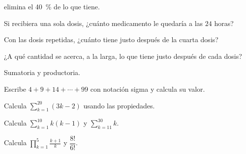 \documentclass[11pt,a4paper]{article}
\begin{document}
\begin{ejercicios}
  elimina el \SI{40}{\percent} de lo que tiene.
  \begin{ejercicios}
  \item Si recibiera una sola dosis, ¿cuánto medicamento le quedaría a las $24$ horas?
  \item Con las dosis repetidas, ¿cuánto tiene justo después de la cuarta dosis?
  \item ¿A qué cantidad se acerca, a la larga, lo que tiene justo después de cada dosis?
  \end{ejercicios}
\item Sumatoria y productoria.
  \begin{ejercicios}
  \item Escribe $4+9+14+\cdots+99$ con notación sigma y calcula su valor.
  \item Calcula $\displaystyle\sum_{k=1}^{20}(3k-2)$ usando las propiedades.
  \item Calcula $\displaystyle\sum_{k=1}^{10}k(k-1)$ y $\displaystyle\sum_{k=11}^{30}k$.
  \item Calcula $\displaystyle\prod_{k=1}^{5}\frac{k+1}{k}$ y $\dfrac{8!}{6!}$.
  \end{ejercicios}
\end{ejercicios}
\end{document}

